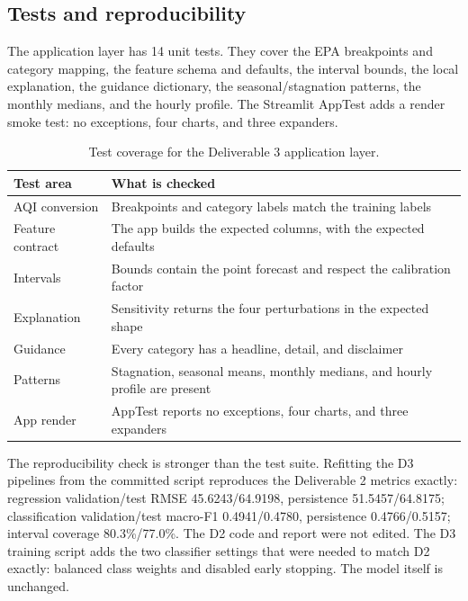 \subsection{Tests and reproducibility}
\label{sec:d3-tests}

The application layer has 14 unit tests. They cover the EPA breakpoints and
category mapping, the feature schema and defaults, the interval bounds, the
local explanation, the guidance dictionary, the seasonal/stagnation patterns,
the monthly medians, and the hourly profile. The Streamlit AppTest adds a render
smoke test: no exceptions, four charts, and three expanders.

\begin{table}[htbp]
\centering
\small
\begin{tabular}{@{}L{4.4cm}L{10.0cm}@{}}
\toprule
\textbf{Test area} & \textbf{What is checked} \\
\midrule
AQI conversion & Breakpoints and category labels match the training labels \\
Feature contract & The app builds the expected columns, with the expected defaults \\
Intervals & Bounds contain the point forecast and respect the calibration factor \\
Explanation & Sensitivity returns the four perturbations in the expected shape \\
Guidance & Every category has a headline, detail, and disclaimer \\
Patterns & Stagnation, seasonal means, monthly medians, and hourly profile are present \\
App render & AppTest reports no exceptions, four charts, and three expanders \\
\bottomrule
\end{tabular}
\caption{Test coverage for the Deliverable 3 application layer.}
\label{tab:tests}
\end{table}

The reproducibility check is stronger than the test suite. Refitting the D3
pipelines from the committed script reproduces the Deliverable 2 metrics exactly:
regression validation/test RMSE 45.6243/64.9198, persistence 51.5457/64.8175;
classification validation/test macro-F1 0.4941/0.4780, persistence
0.4766/0.5157; interval coverage 80.3\%/77.0\%. The D2 code and report were not
edited. The D3 training script adds the two classifier settings that were needed
to match D2 exactly: balanced class weights and disabled early stopping. The
model itself is unchanged.

